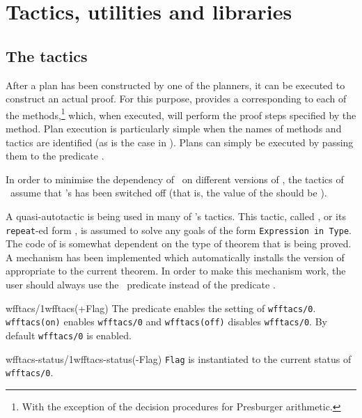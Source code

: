 \def\rcsid{$Id: tactics_util.tex,v 1.12 2003/01/22 19:35:44 smaill Exp $}


\chapter [Tactics etc]{Tactics, utilities and libraries}
\section {The tactics}
\label{tactics}
After a plan has been constructed by one of the planners, it can be
executed to construct an actual \oyster proof. For this purpose, \clam
provides a  corresponding to each of the methods,\footnote
{With the exception of the decision procedures for Presburger arithmetic.}
which, when executed, will perform the proof steps specified by the
method. Plan execution is particularly simple when the names of
methods and tactics are identified (as is the case in \clam). Plans
can simply be executed by passing them to the \oyster predicate
. 

In order to minimise the dependency of \clam\ on different versions of
\oyster, the tactics of \clam\ assume that \oyster's 
has been switched off (that is, the value of the  should be 
).

A quasi-autotactic is being used in many of {\clam}'s tactics. This
tactic, called , or its {\tt repeat}-ed form
, is assumed to solve any goals of the form
{\tt Expression in Type}. The code of  is somewhat
dependent on the type of theorem that is being proved. A mechanism has
been implemented which automatically installs the version of 
appropriate to the current theorem. In order to make this mechanism
work, the user should always use the \clam\ predicate 
instead of the \oyster predicate .

\begin{predicate}{wfftacs/1}{wfftacs(+Flag)}%
The  predicate enables the setting of {\tt wfftacs/0}. 
{\tt wfftacs(on)} enables {\tt wfftacs/0} and {\tt wfftacs(off)}
disables {\tt wfftacs/0}. By default {\tt wfftacs/0} is enabled.
\end{predicate}

\begin{predicate}{wfftacs-status/1}{wfftacs-status(-Flag)}%
{\tt Flag} is instantiated to the current status of {\tt wfftacs/0}.
\end{predicate}

